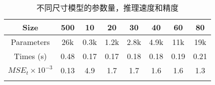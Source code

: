 
\begin{center}
\begin{table}
	\caption{不同尺寸模型的参数量，推理速度和精度}
	\begin{tabular}{cccccccc}
		\toprule
		 Size			&				500		&	10		&	20		&	30		&	40		&	60		&	80		\\	\midrule
		 Parameters		&				26k		&	0.3k	&	1.2k	&	2.8k	&	4.9k	&	11k		&	19k	 	\\	
		 Times (s)		&				0.48	&	0.17	&	0.17	&	0.18	&	0.18	&	0.19	&	0.21	\\	
		 \(MSE_t\times 10^{-3}\)&		0.13	&	4.9		&	1.7		&	1.7		&	1.6		&	1.6		&	1.3		\\
	\bottomrule
	\label{tab:accuracy}
	\end{tabular}
\end{table}
\end{center}
